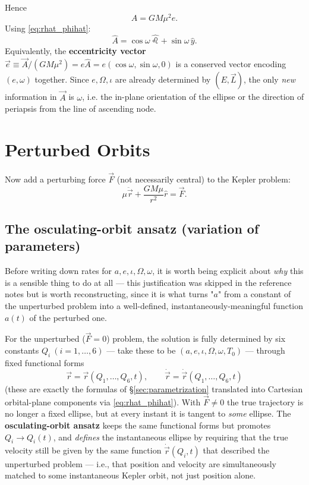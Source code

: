 \documentclass[11pt]{article}
\newcommand{\vecr}{\vec r}
\newcommand{\vecL}{\vec L}
\newcommand{\vecA}{\vec A}
\newcommand{\vecF}{\vec F}
\newcommand{\hatn}{\hat \leo}
\newcommand{\rhat}{\hat r}
\begin{document}
Hence
\begin{equation}
\boxed{A = GM\mu^2 e.} \label{eq:A_magnitude}
\end{equation}
Using \eqref{eq:rhat_phihat}:
\begin{equation}
\hat A = \cos\omega\,\hatn+\sin\omega\,\hat y. \label{eq:Ahat}
\end{equation}
Equivalently, the \textbf{eccentricity vector} $\vec e \equiv \vecA/(GM\mu^2) = e\hat A=e(\cos\omega,\sin\omega,0)$ is a conserved vector encoding $(e,\omega)$ together. Since $e,\Omega,\iota$ are already determined by $(E,\vecL)$, the only \emph{new} information in $\vecA$ is $\omega$, i.e. the in-plane orientation of the ellipse or the direction of periapsis from the line of ascending node.

\section{Perturbed Orbits}

Now add a perturbing force $\vecF$ (not necessarily central) to the Kepler problem:
\begin{equation}
\mu\ddot{\vecr}+\frac{GM\mu}{r^2}\rhat = \vecF. \label{eq:perturbed_eom}
\end{equation}

\subsection{The osculating-orbit ansatz (variation of parameters)}
\label{sec:osculating_ansatz}

Before writing down rates for $a,e,\iota,\Omega,\omega$, it is worth being explicit about \emph{why} this is a sensible thing to do at all — this justification was skipped in the reference notes but is worth reconstructing, since it is what turns "$a$" from a constant of the unperturbed problem into a well-defined, instantaneously-meaningful function $a(t)$ of the perturbed one.

For the unperturbed ($\vecF=0$) problem, the solution is fully determined by six constants $Q_i\ (i=1,\dots,6)$ — take these to be $(a,e,\iota,\Omega,\omega,T_0)$ — through fixed functional forms
\[
\vecr = \vecr(Q_1,\dots,Q_6,t), \qquad \dot{\vecr}=\dot{\vecr}(Q_1,\dots,Q_6,t)
\]
(these are exactly the formulas of \S\ref{sec:parametrization} translated into Cartesian orbital-plane components via \eqref{eq:rhat_phihat}). With $\vecF\neq0$ the true trajectory is no longer a fixed ellipse, but at every instant it is tangent to \emph{some} ellipse. The \textbf{osculating-orbit ansatz} keeps the same functional forms but promotes $Q_i\to Q_i(t)$, and \emph{defines} the instantaneous ellipse by requiring that the true velocity still be given by the same function $\dot{\vecr}(Q_i,t)$ that described the unperturbed problem — i.e., that position and velocity are simultaneously matched to some instantaneous Kepler orbit, not just position alone.
\end{document}
